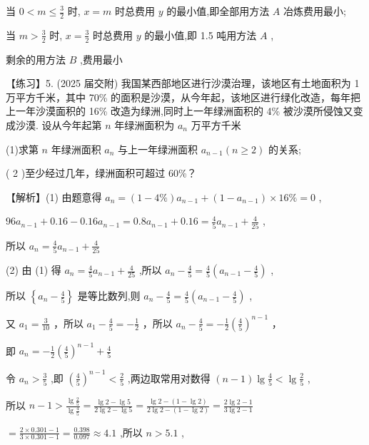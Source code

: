 \documentclass[10pt]{article}
\begin{document}
当 \(0 < m \leq  \frac{3}{2}\) 时, \(x = m\) 时总费用 \(y\) 的最小值,即全部用方法 \(A\) 冶炼费用最小;

当 \(m > \frac{3}{2}\) 时, \(x = \frac{3}{2}\) 时总费用 \(y\) 的最小值,即 1.5 吨用方法 \(A\) ,

剩余的用方法 \(B\) ,费用最小

【练习】5. (2025 届交附) 我国某西部地区进行沙漠治理，该地区有土地面积为 1 万平方千米，其中 70\% 的面积是沙漠，从今年起，该地区进行绿化改造，每年把上一年沙漠面积的 16\% 改造为绿洲,同时上一年绿洲面积的 4\% 被沙漠所侵蚀又变成沙漠. 设从今年起第 \(n\) 年绿洲面积为 \({a}_{n}\) 万平方千米

(1)求第 \(n\) 年绿洲面积 \({a}_{n}\) 与上一年绿洲面积 \({a}_{n - 1}\left( {n \geq  2}\right)\) 的关系;

( 2 )至少经过几年，绿洲面积可超过 60\%？

【解析】(1) 由题意得 \({a}_{n} = \left( {1 - 4\% }\right) {a}_{n - 1} + \left( {1 - {a}_{n - 1}}\right)  \times  {16}\%  = 0\) ,

\({96}{a}_{n - 1} + {0.16} - {0.16}{a}_{n - 1} = {0.8}{a}_{n - 1} + {0.16} = \frac{4}{5}{a}_{n - 1} + \frac{4}{25}\) ,

所以 \({a}_{n} = \frac{4}{5}{a}_{n - 1} + \frac{4}{25}\)

(2) 由 (1) 得 \({a}_{n} = \frac{4}{5}{a}_{n - 1} + \frac{4}{25}\) ,所以 \({a}_{n} - \frac{4}{5} = \frac{4}{5}\left( {{a}_{n - 1} - \frac{4}{5}}\right)\) ,

所以 \(\left\{  {{a}_{n} - \frac{4}{5}}\right\}\) 是等比数列,则 \({a}_{n} - \frac{4}{5} = \frac{4}{5}\left( {{a}_{n - 1} - \frac{4}{5}}\right)\) ,

又 \({a}_{1} = \frac{3}{10}\) ，所以 \({a}_{1} - \frac{4}{5} =  - \frac{1}{2}\) ，所以 \({a}_{n} - \frac{4}{5} =  - \frac{1}{2}{\left( \frac{4}{5}\right) }^{n - 1}\) ，

即 \({a}_{n} =  - \frac{1}{2}{\left( \frac{4}{5}\right) }^{n - 1} + \frac{4}{5}\)

令 \({a}_{n} > \frac{3}{5}\) ,即 \({\left( \frac{4}{5}\right) }^{n - 1} < \frac{2}{5}\) ,两边取常用对数得 \(\left( {n - 1}\right) \lg \frac{4}{5} < \lg \frac{2}{5}\) ,

所以 \(n - 1 > \frac{\lg \frac{2}{5}}{\lg \frac{4}{5}} = \frac{\lg 2 - \lg 5}{2\lg 2 - \lg 5} = \frac{\lg 2 - \left( {1 - \lg 2}\right) }{2\lg 2 - \left( {1 - \lg 2}\right) } = \frac{2\lg 2 - 1}{3\lg 2 - 1}\)

\(= \frac{2 \times  {0.301} - 1}{3 \times  {0.301} - 1} = \frac{0.398}{0.097} \approx  {4.1}\) ,所以 \(n > {5.1}\) ,
\end{document}
